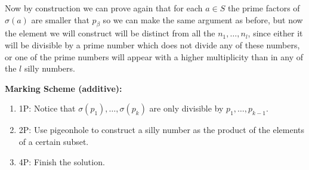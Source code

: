 {Now by construction we can prove again that for each $a\in S$ the prime factors of $\sigma(a)$ are smaller that $p_{\beta}$ so we can make the same argument as before, but now the element we will construct will be distinct from all the $n_1, \ldots, n_l$, since either it will be divisible by a prime number which does not divide any of these numbers, or one of the prime numbers will appear with a higher multiplicity than in any of the $l$ silly numbers. 

\bigskip

\textbf{Marking Scheme (additive):}

\begin{enumerate}
    \item 1P: Notice that $\sigma(p_1), \ldots, \sigma(p_k)$ are only divisible by $p_1, \ldots, p_{k-1}$.
    \item 2P: Use pigeonhole to construct a silly number as the product of the elements of a certain subset.
    \item 4P: Finish the solution.
\end{enumerate}
}